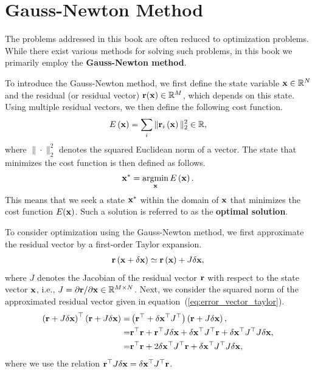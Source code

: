 \section{Gauss-Newton Method}
\label{subsec:gauss-newton_method}

The problems addressed in this book are often reduced to optimization problems.
While there exist various methods for solving such problems, in this book we primarily employ the {\bf Gauss-Newton method}.

To introduce the Gauss-Newton method, we first define the state variable ${\bf x} \in \mathbb{R}^{N}$ and the residual (or residual vector) ${\bf r}({\bf x}) \in \mathbb{R}^{M}$, which depends on this state.
Using multiple residual vectors, we then define the following cost function.
%
\begin{align}
  E \left( {\bf x} \right) = \sum_{i} \| {\bf r}_{i} \left( {\bf x} \right) \|_{2}^{2} \in \mathbb{R},
\end{align}
%
where $\| \cdot \|_{2}^{2}$ denotes the squared Euclidean norm of a vector.
The state that minimizes the cost function is then defined as follows.
%
\begin{align}
  {\bf x}^{*} = \mathop{\rm argmin}\limits_{ {\bf x} } E \left( {\bf x} \right).
\end{align}
%
This means that we seek a state ${\bf x}^{*}$ within the domain of ${\bf x}$ that minimizes the cost function $E({\bf x})$.
Such a solution is referred to as the {\bf optimal solution}.

To consider optimization using the Gauss-Newton method, we first approximate the residual vector by a first-order Taylor expansion.
%
\begin{align}
  {\bf r} \left( {\bf x} + \delta {\bf x} \right) \simeq {\bf r} \left( {\bf x} \right) + J \delta {\bf x},
  \label{eq:error_vector_taylor}
\end{align}
%
where $J$ denotes the Jacobian of the residual vector ${\bf r}$ with respect to the state vector ${\bf x}$, i.e., $J = \partial {\bf r} / \partial {\bf x} \in \mathbb{R}^{M \times N}$.
Next, we consider the squared norm of the approximated residual vector given in equation~(\ref{eq:error_vector_taylor}).
%
\begin{align}
  \begin{split}
    \left( {\bf r} + J \delta {\bf x} \right)^{\top} \left( {\bf r} + J \delta {\bf x} \right)
    = & \left( {\bf r}^{\top} + \delta {\bf x}^{\top} J^{\top} \right) \left( {\bf r} + J \delta {\bf x} \right), \\
    = & {\bf r}^{\top} {\bf r} + {\bf r}^{\top} J \delta {\bf x} + \delta {\bf x}^{\top} J^{\top} {\bf r} + \delta {\bf x}^{\top} J^{\top} J \delta {\bf x}, \\
    = & {\bf r}^{\top} {\bf r} + 2 \delta {\bf x}^{\top} J^{\top} {\bf r} + \delta {\bf x}^{\top} J^{\top} J \delta {\bf x},
  \end{split}
  \label{eq:error_vector_taylor_sq_norm}
\end{align}
%
where we use the relation ${\bf r}^{\top} J \delta {\bf x} = \delta {\bf x}^{\top} J^{\top} {\bf r}$.


